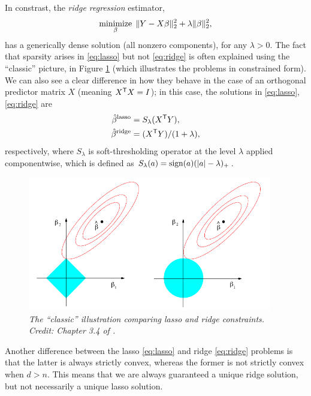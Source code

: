 \documentclass{article}
\begin{document}
In constrast, the \emph{ridge regression} estimator, 
\begin{equation}
\label{eq:ridge}
\mathop{\mathrm{minimize}}_\beta \; \|Y - X\beta\|_2^2 + \lambda \|\beta\|_2^2, 
\end{equation}
has a generically dense solution (all nonzero components), for any $\lambda >
0$. The fact that sparsity arises in \eqref{eq:lasso} but not \eqref{eq:ridge}
is often explained using the ``classic'' picture, in Figure
\ref{fig:lasso_ridge} (which illustrates the problems in constrained form). We
can also see a clear difference in how they behave in the case of an orthogonal
predictor matrix $X$ (meaning $X^{\mathsf{T}} X = I$); in this case, the solutions in
\eqref{eq:lasso}, \eqref{eq:ridge} are  
\begin{align*}
\hat{\beta}^{\text{lasso}} &= S_\lambda(X^{\mathsf{T}} Y), \\
\hat{\beta}^{\text{ridge}} &= (X^{\mathsf{T}} Y) / (1+\lambda),
\end{align*}
respectively, where $S_\lambda$ is soft-thresholding operator at the level
$\lambda$ applied componentwise, which is defined as $S_\lambda(a) = \mathrm{sign}(a)
(|a| - \lambda)_+$.  

\begin{figure}[htb]
\centering
\includegraphics[width=0.95\textwidth]{lasso_ridge.pdf}
\caption{\it The ``classic'' illustration comparing lasso and ridge
  constraints. Credit: Chapter 3.4 of \citet{hastie2009elements}.}  
\label{fig:lasso_ridge}
\end{figure}

Another difference between the lasso \eqref{eq:lasso} and ridge \eqref{eq:ridge}
problems is that the latter is always strictly convex, whereas the former is not
strictly convex when $d>n$. This means that we are always guaranteed a unique
ridge solution, but not necessarily a unique lasso solution.   
\end{document}
